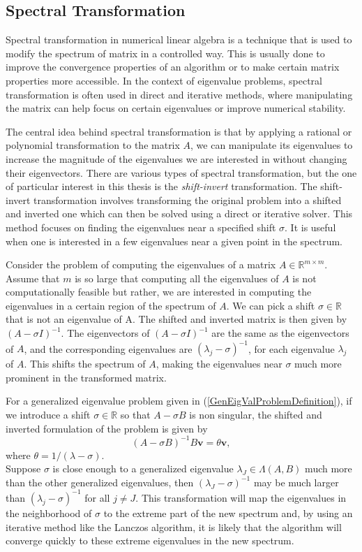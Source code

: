 \subsection{Spectral Transformation}\label{sec:SpectralTransformationDefinition}
Spectral transformation in numerical linear algebra is a technique that is used to modify the spectrum of matrix in a controlled way. This is usually done to improve the convergence properties of an algorithm or to make certain matrix properties more accessible. In the context of eigenvalue problems, spectral transformation is often used in direct and iterative methods, where manipulating the matrix can help focus on certain eigenvalues or improve numerical stability.

The central idea behind spectral transformation is that by applying a rational or polynomial transformation to the matrix $A$, we can manipulate its eigenvalues to increase the magnitude of the eigenvalues we are interested in without changing their eigenvectors. There are various types of spectral transformation, but the one of particular interest in this thesis is the \textit{shift-invert} transformation. The shift-invert transformation involves transforming the original problem into a shifted and inverted one which can then be solved using a direct or iterative solver. This method focuses on finding the eigenvalues near a specified shift $\sigma$. It is useful when one is interested in a few eigenvalues near a given point in the spectrum.

Consider the problem of computing the eigenvalues of a matrix $A \in \mathbb{R}^{m \times m}$. Assume that $m$ is so large that computing all the eigenvalues of $A$ is not computationally feasible but rather, we are interested in computing the eigenvalues in a certain region of the spectrum of $A$. We can pick a shift $\sigma \in \mathbb{R}$ that is not an eigenvalue of A. The shifted and inverted matrix is then given by $(A - \sigma I)^{-1}$. The eigenvectors of $(A - \sigma I)^{-1}$ are the same as the eigenvectors of $A$, and the corresponding eigenvalues are $(\lambda_j - \sigma)^{-1}$, for each eigenvalue $\lambda_j$ of $A$. This shifts the spectrum of $A$, making the eigenvalues near $\sigma$ much more prominent in the transformed matrix.

For a generalized eigenvalue problem given in (\ref{GenEigValProblemDefinition}), if we introduce a shift $\sigma \in \mathbb{R}$ so that $A - \sigma B$ is non singular, the shifted and inverted formulation of the problem is given by
\begin{equation}\label{eq:SpectralTransFormulation}
	(A - \sigma B)^{-1} B\mathbf{v} = \theta \mathbf{v},
\end{equation}
where $\theta = 1 / (\lambda - \sigma)$.\\
Suppose $\sigma$ is close enough to a generalized eigenvalue $\lambda_J \in \Lambda(A, B)$ much more than the other generalized eigenvalues, then $(\lambda_J - \sigma)^{-1}$ may be much larger than $(\lambda_j - \sigma)^{-1}$ for all $j \neq J$. This transformation will map the eigenvalues in the neighborhood of $\sigma$ to the extreme part of the new spectrum and, by using an iterative method like the Lanczos algorithm, it is likely that the algorithm will converge quickly to these extreme eigenvalues in the new spectrum.
